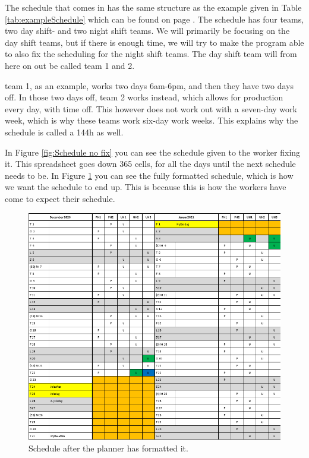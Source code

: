 The schedule that comes in has the same structure as the example given in Table \ref{tab:exampleSchedule} which can be found on page \pageref{tab:exampleSchedule}. The schedule has four teams, two day shift- and two night shift teams. We will primarily be focusing on the day shift teams, but if there is enough time, we will try to make the program able to also fix the scheduling for the night shift teams. The day shift team will from here on out be called \primo team 1 and 2.


\primo team 1, as an example, works two days 6am-6pm, and then they have two days off. In those two days off, \primo team 2 works instead, which allows for production every day, with time off. This however does not work out with a seven-day work week, which is why these teams work six-day work weeks. This explains why the schedule is called a 144h as well.


In Figure \ref{fig:Schedule no fix} you can see the schedule given to the worker fixing it. This spreadsheet goes down 365 cells, for all the days until the next schedule needs to be. In Figure \ref{fig:Schedule formated} you can see the fully formatted schedule, which is how we want the schedule to end up. This is because this is how the workers have come to expect their schedule.

\begin{figure}[ht!]
    \centering
    \includegraphics[width=\textwidth]{media/Schedule formated.png}
    \caption{Schedule after the planner has formatted it.}
    \label{fig:Schedule formated}
\end{figure}



